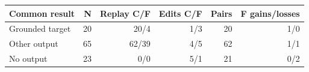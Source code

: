 \begin{tabular}{lrrrrr}
\toprule
Common result & N & Replay C/F & Edits C/F & Pairs & F gains/losses \\
\midrule
Grounded target & 20 & 20/4 & 1/3 & 20 & 1/0 \\
Other output & 65 & 62/39 & 4/5 & 62 & 1/1 \\
No output & 23 & 0/0 & 5/1 & 21 & 0/2 \\
\bottomrule
\end{tabular}
